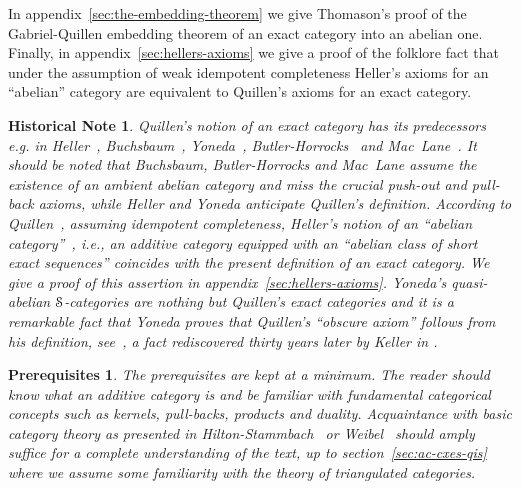 \documentclass[1p]{elsarticle}
\theoremstyle{mythm}
\theoremstyle{mydef}
\newtheorem*{Histrem}{Historical Note}
\newtheorem*{Prerequisites}{Prerequisites}
\begin{document}
In appendix~\ref{sec:the-embedding-theorem} we give Thomason's
proof of the Gabriel-Quillen
embedding theorem of an exact category into an abelian one. 
Finally, in appendix~\ref{sec:hellers-axioms}
we give a proof of the folklore fact that under the
assumption of weak idempotent completeness Heller's axioms for an
``abelian'' category are equivalent to Quillen's axioms for an exact category.



\begin{Histrem}
  Quillen's notion of an exact category has its predecessors e.g. in
  Heller~\cite{MR0100622}, %
  Buchsbaum~\cite{MR0140556}, %
  Yoneda~\cite{MR0225854}, %
  Butler-Horrocks~\cite{MR0188267} %
  and Mac~Lane~\cite[XII.4]{MR0156879}. %
  It should be noted that Buchsbaum, Butler-Horrocks and Mac~Lane
  assume the existence of an ambient abelian category and miss the
  crucial push-out and pull-back axioms, while Heller and Yoneda
  anticipate Quillen's definition. According to
  Quillen~\cite[p.~``92/16/100'']{MR0338129}, assuming idempotent
  completeness, Heller's notion of an ``abelian
  category''~\cite[\S~3]{MR0100622}, 
  i.e., an additive category
  equipped with an ``abelian class of short exact
  sequences''%
  coincides
  with the present definition of an exact category. We give a proof of
  this assertion in appendix~\ref{sec:hellers-axioms}.  Yoneda's
  quasi-abelian $\operatorname{\mathcal{S}}$-categories are nothing but Quillen's exact
  categories and it is a remarkable fact that Yoneda proves that
  Quillen's ``obscure axiom'' follows from his definition,
  see~\cite[p.~525, Corollary]{MR0225854}, a fact rediscovered thirty
  years later by Keller in \cite[A.1]{MR1052551}.
\end{Histrem}



\begin{Prerequisites} 
  The prerequisites are kept at a minimum. The
  reader should know what an additive category is and be familiar with
  fundamental categorical concepts such as kernels, pull-backs,
  products and duality. Acquaintance with basic category theory as
  presented in Hilton-Stammbach~\cite[Chapter~II]{MR1438546}
  or Weibel~\cite[Appendix~A]{MR1269324} should amply suffice for a complete
  understanding of the text, up to section~\ref{sec:ac-cxes-qis} where
  we assume some familiarity with the theory of
  triangulated categories.
\end{Prerequisites}
\end{document}
